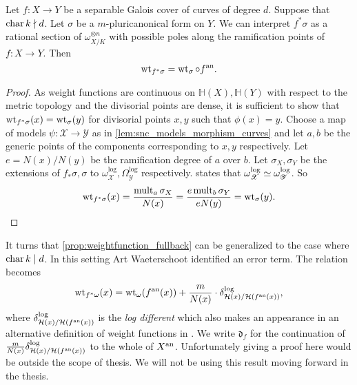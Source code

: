 \begin{theorem}\label{prop:weightfunction_fullback}
	Let $f: X \to Y$ be a separable Galois cover of curves of degree $d$. 
	Suppose that $\operatorname{char} k \nmid d$. 
	Let $\sigma$ be a $m$-pluricanonical form on $Y$. 
	We can interpret $f^*\sigma$ as a rational section of $\omega_{X / K}^{\otimes n}$ with possible poles along the ramification points of $f: X \to Y$. 
	Then \[
		\operatorname{wt}_{f^*\sigma} = \operatorname{wt}_{\sigma} \circ f{}^{\text{an}}
	.\] 
\end{theorem}
\begin{proof}
	As weight functions are continuous on $\mathbb{H}(X), \mathbb{H}(Y)$ with respect to the metric topology and the divisorial points are dense, it is sufficient to show that $\operatorname{wt}_{f^* \sigma}(x) = \operatorname{wt}_{\sigma}(y)$ 
	for divisorial points  $x, y$ such that $\phi(x) = y$. 
	Choose a map of models $\psi: \mathscr X \to \mathscr Y$ as in \cref{lem:snc_models_morphism_curves} and let $a, b$ be the generic points of the components corresponding to $x, y $  respectively. 
	Let $e = N(x) / N(y)$ be the ramification degree of $a$ over $b$. 
	Let $\sigma_X, \sigma_Y$ be the extensions of $f_*\sigma, \sigma$ to $\omega^{\text{log}}_{\mathscr X}, \Omega^{\text{log}}_{\mathscr Y}$ respectively. 
	 states that $\omega^{\text{log}}_{\mathscr{X}} \simeq \omega^{\text{log}}_{\mathscr{Y}}$. 
	So \[
		\operatorname{wt}_{f^* \sigma}(x) = \frac{\operatorname{mult}_a \sigma_X}{ N(x) } = \frac{e \operatorname{mult}_b \sigma_Y }{e N(y)} = \operatorname{wt}_{\sigma}(y)
	.\] 
\end{proof}

\begin{remark}\label{rem:weightfunction_fullback_art} 
	It turns that \cref{prop:weightfunction_fullback} can be generalized to the case where $\operatorname{char} k \mid d$. 
	In this setting Art Waeterschoot identified an error term. 
	The relation becomes \[
		\operatorname{wt}_{f^* \omega}(x) = \operatorname{wt}_{\omega}(f{}^{\text{an}} (x)) + \frac{m}{N(x)} \cdot \delta_{\mathcal{H} (x) / \mathcal{H} (f{}^{\text{an}}(x))}^{\text{log}}
	,\] 
	where $\delta_{\mathcal{H} (x) / \mathcal{H} (f{}^{\text{an}}(x))}^{\text{log}}$ is the \emph{log different} which also makes an appearance in an alternative definition of weight functions in \cite{temkinMetrizationDifferentialPluriforms2016a}.
	We write $\mathfrak{d}_f $ for the continuation of $\frac{m}{N(x)} \delta_{\mathcal{H} (x) / \mathcal{H} (f{}^{\text{an}}(x))}^{\text{log}}$ to the whole of $X{}^{\text{an}}$. 
	Unfortunately giving a proof here would be outside the scope of thesis.
	We will not be using this result moving forward in the thesis. 
\end{remark}



